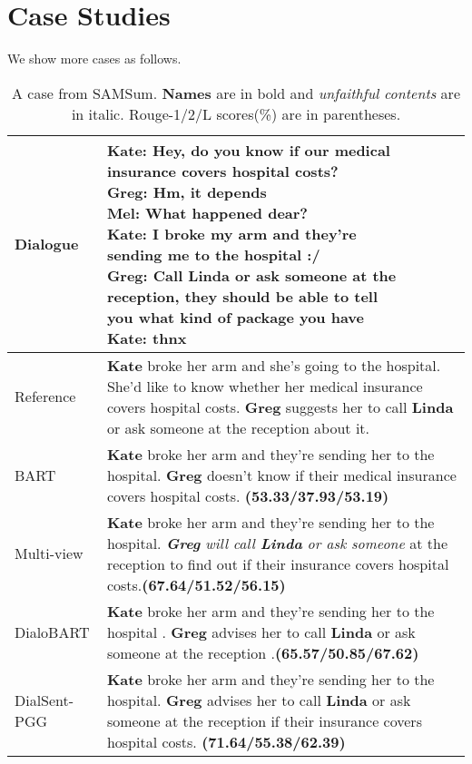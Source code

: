 \section{Case Studies}

We show more cases as follows.


\begin{table}[h]
	\small
	\centering
	\begin{tabular}{lp{4.9cm}}
		\toprule[1pt]
		{Dialogue} &  \makecell[l]{\textbf{Kate}: Hey, do you know if our medical \\insurance covers hospital costs? \\\textbf{Greg}: Hm, it depends \\\textbf{Mel}: What happened dear? \\\textbf{Kate}: I broke my arm and they're \\sending me to the hospital :/ \\\textbf{Greg}: Call Linda or ask someone at the \\reception, they should be able to tell \\you what kind of package you have \\\textbf{Kate}: thnx} \\
		
		\hline
		{Reference} & \textbf{Kate} broke her arm and she's going to the hospital. She'd like to know whether her medical insurance covers hospital costs. \textbf{Greg} suggests her to call \textbf{Linda} or ask someone at the reception about it. \\
		
		
		\hline
		{BART} &   \textbf{Kate} broke her arm and they're sending her to the hospital. \textbf{Greg} doesn't know if their medical insurance covers hospital costs. \textbf{(53.33/37.93/53.19)}\\
		
		\hline
		{Multi-view} &  \textbf{Kate} broke her arm and they're sending her to the hospital. \textit{\textbf{Greg} will call \textbf{Linda} or ask someone} at the reception to find out if their insurance covers hospital costs.\textbf{(67.64/51.52/56.15)}\\
		
		\hline
		{DialoBART} &   \textbf{Kate} broke her arm and they're sending her to the hospital . \textbf{Greg} advises her to call \textbf{Linda} or ask someone at the reception .\textbf{(65.57/50.85/67.62)}\\
		
		\hline
		{DialSent-PGG} &\textbf{Kate} broke her arm and they're sending her to the hospital. \textbf{Greg} advises her to call \textbf{Linda} or ask someone at the reception if their insurance covers hospital costs. \textbf{(71.64/55.38/62.39)}\\
		\bottomrule[1pt]
	\end{tabular}
	\caption{A case from SAMSum. \textbf{Names} are in bold and \textit{unfaithful contents} are in italic. Rouge-1/2/L scores(\%) are in parentheses.}
	\label{tab:case1}
\end{table}

